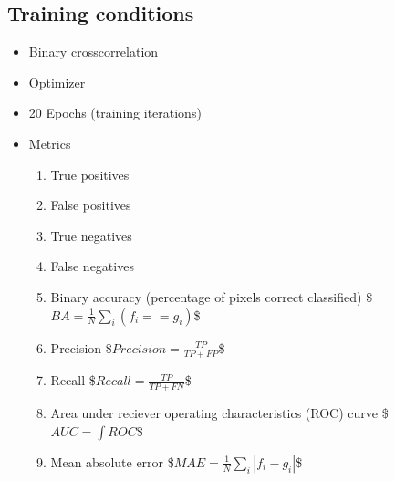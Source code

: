 \documentclass[letterpaper,10pt,english]{sphinxmanual}
\begin{document}
\begin{sphinxVerbatim}[commandchars=\\\{\}]
  
\end{sphinxVerbatim}

\noindent{}


\subsection{Training conditions}
\label{\detokenize{ML4NeutronImageSegmentation:training-conditions}}\begin{itemize}
\item {} 
 \sphinxhyphen{} Binary cross\sphinxhyphen{}correlation

\item {} 
Optimizer \sphinxhyphen{} 

\item {} 
20 Epochs (training iterations)

\item {} 
Metrics
\begin{enumerate}
%
\item {} 
True positives

\item {} 
False positives

\item {} 
True negatives

\item {} 
False negatives

\item {} 
Binary accuracy (percentage of pixels correct classified)
\$\(BA=\frac{1}{N}\sum_i(f_i==g_i)\)\$

\item {} 
Precision
\$\(Precision=\frac{TP}{TP+FP}\)\$

\item {} 
Recall
\$\(Recall=\frac{TP}{TP+FN}\)\$

\item {} 
Area under reciever operating characteristics (ROC) curve
\$\(AUC=\int ROC\)\$

\item {} 
Mean absolute error
\$\(MAE=\frac{1}{N}\sum_i|f_i-g_i|\)\$

\end{enumerate}

\end{itemize}
\end{document}
